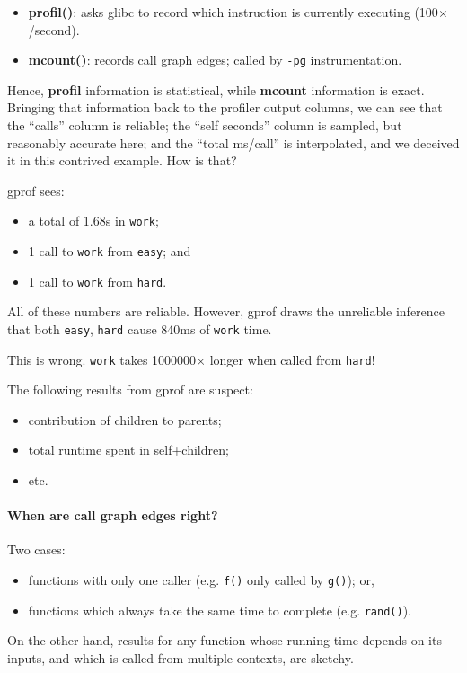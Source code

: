 \begin{itemize}
\item {\bf profil()}: asks glibc to record which instruction 
  is currently executing (100$\times$/second).
\item {\bf mcount()}: records call graph edges; called by {\tt -pg} instrumentation.
\end{itemize}

Hence, {\bf profil} information is statistical, while {\bf mcount}
information is exact.  Bringing that information back to the profiler
output columns, we can see that the ``calls'' column is reliable; the
``self seconds'' column is sampled, but reasonably accurate here; and
the ``total ms/call'' is interpolated, and we deceived it in this
contrived example. How is that?

gprof sees:
\begin{itemize}
    \item a total of 1.68s in {\tt work};
    \item 1 call to {\tt work} from {\tt easy}; and
    \item 1 call to {\tt work} from {\tt hard}.
\end{itemize}
All of these numbers are reliable. However, gprof draws the unreliable inference that
both {\tt easy}, {\tt hard} cause 840ms of {\tt work} time.

This is wrong. {\tt work} takes 1000000$\times$ longer when called from {\tt hard}!

The following results from gprof are suspect:
\begin{itemize}
  \item contribution of children to parents;
  \item total runtime spent in self+children;
  \item etc.
\end{itemize}

\paragraph{When are call graph edges right?}
Two cases:
    \begin{itemize}
    \item functions with only one caller
      (e.g. {\tt f()} only called by {\tt g()}); or,
    \item functions which always take the same time to complete
      (e.g. {\tt rand()}).
    \end{itemize}

On the other hand, results for any function whose running time depends on its inputs,
and which is called from multiple contexts, are sketchy.

